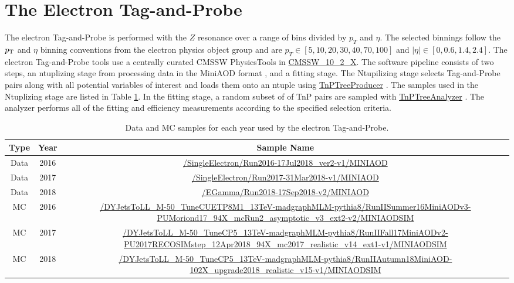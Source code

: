 \section{The Electron Tag-and-Probe }

The electron Tag-and-Probe is performed with the $Z$ resonance over a range of bins divided by $p_T$ and $\eta$. The selected binnings follow the $p_{\mathrm{T}}$ and $\eta$ binning conventions from the electron physics object group and are $ p_T \in [5, 10, 20, 30, 40, 70, 100]$ and $|\eta| \in [ 0, 0.6, 1.4, 2.4]$. The electron Tag-and-Probe tools use a centrally curated CMSSW PhysicsTools in \url{CMSSW_10_2_X}. The software pipeline consists of two steps, an ntuplizing stage from processing data in the MiniAOD format \cite{Petrucciani:2015gjw}, and a fitting stage. The Ntupilizing stage selects Tag-and-Probe pairs along with all potential variables of interest and loads them onto an ntuple using \url{TnPTreeProducer} \cite{ElTnPGit}. The samples used in the Ntuplizing stage are listed in Table \ref{tab:electronTnPSamples}. In the fitting stage, a random subset of of TnP pairs are sampled with \url{TnPTreeAnalyzer} \cite{ElTnPAnaGit}. The analyzer performs all of the fitting and efficiency measurements according to the specified selection criteria. 

\begin{table}
\caption{ Data and MC samples for each year used by the electron Tag-and-Probe. }
\label{tab:electronTnPSamples}
\scriptsize
\begin{adjustwidth}{-0.5in}{-1in}
\begin{tabular}{cc|c}
\hline
Type & Year & Sample Name \\ 
\hline
\hline 
Data & 2016 & \tiny \url{/SingleElectron/Run2016-17Jul2018_ver2-v1/MINIAOD}  \\  
Data & 2017 & \tiny \url{/SingleElectron/Run2017-31Mar2018-v1/MINIAOD} \\  
Data & 2018 & \tiny \url{/EGamma/Run2018-17Sep2018-v2/MINIAOD} \\ 
\hline 
MC & 2016 & \tiny \url{/DYJetsToLL_M-50_TuneCUETP8M1_13TeV-madgraphMLM-pythia8/RunIISummer16MiniAODv3-PUMoriond17_94X_mcRun2_asymptotic_v3_ext2-v2/MINIAODSIM} \\ 
MC & 2017 & \tiny \url{/DYJetsToLL_M-50_TuneCP5_13TeV-madgraphMLM-pythia8/RunIIFall17MiniAODv2-PU2017RECOSIMstep_12Apr2018_94X_mc2017_realistic_v14_ext1-v1/MINIAODSIM} \\ 
MC & 2018 & \tiny \url{/DYJetsToLL_M-50_TuneCP5_13TeV-madgraphMLM-pythia8/RunIIAutumn18MiniAOD-102X_upgrade2018_realistic_v15-v1/MINIAODSIM} \\
\hline
\end{tabular} 
\end{adjustwidth}
\end{table}




